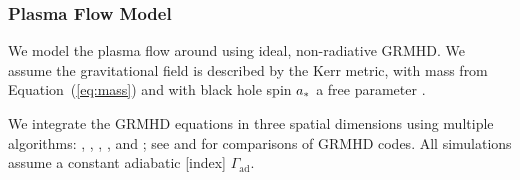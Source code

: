 \subsubsection{Plasma Flow Model}

We model the plasma flow around \sgra using ideal, non-radiative GRMHD.  We assume the gravitational field
is described by the Kerr metric, with mass from Equation~(\ref{eq:mass}) and with black hole spin $a_*$ a free parameter \citep[see e.g.,][]{2003ApJ...589..444G, 2005ApJ...635..723A, 2007A&A...473...11D}.

We integrate the GRMHD equations in three spatial dimensions using multiple algorithms:
\kharma   \citep{2021JOSS....6.3336P},
\bhac     \citep{2017ComAC...4....1P},
\hamr     \citep{Liska2018},
\koral    \citep{2013MNRAS.429.3533S}, and
\athenapp \citep{2016ApJS..225...22W};
see \citet{2019ApJS..243...26P} and \citet{Olivares_et_al} for comparisons of GRMHD codes.
All simulations assume a constant adiabatic \mbox[index]  $\Gamma_\mathrm{ad}$.

